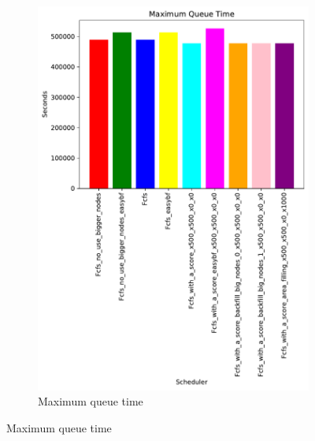 \documentclass[a4paper]{article}
\begin{document}
\begin{figure}[H]
\begin{subfigure}[b]{0.4\linewidth}\centering\includegraphics[width=1\linewidth]{MBSS/plot/Results_Size_And_Data_2022-01-24->2022-01-24_Maximum_queue_time_450_128_32_256_4_1024.pdf}\caption{Maximum queue time}\label{19}\end{subfigure}

\end{figure}
\end{document}
